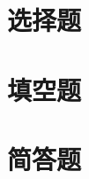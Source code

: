 \documentclass{exam} %
\begin{document}
\tableofcontents\clearpage %

\section{选择题}
    

\section{填空题}
    

\section{简答题}
    
\end{document}
